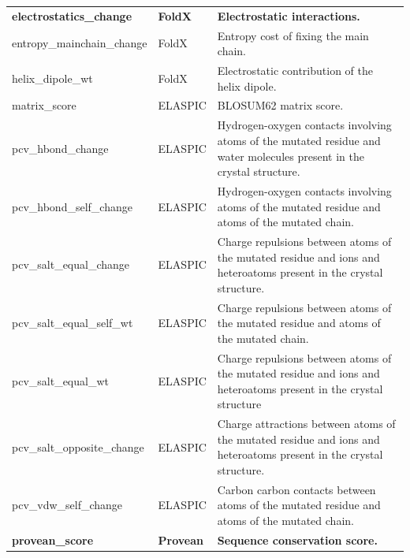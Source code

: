 \begin{table}[tb]
\begin{tabular}{ l | l | p{7cm} }
		\textbf{electrostatics\_change}           & \textbf{FoldX}   & \textbf{Electrostatic interactions.}                                                                                  \\
		entropy\_mainchain\_change                & FoldX            & Entropy cost of fixing the main chain.                                                                                \\
		helix\_dipole\_wt                         & FoldX            & Electrostatic contribution of the helix dipole.                                                                       \\
		matrix\_score                             & ELASPIC          & BLOSUM62 matrix score.                                                                                                \\
		pcv\_hbond\_change                        & ELASPIC          & Hydrogen-oxygen contacts involving atoms of the mutated residue and water molecules present in the crystal structure. \\
		pcv\_hbond\_self\_change                  & ELASPIC          & Hydrogen-oxygen contacts involving atoms of the mutated residue and atoms of the mutated chain.                       \\
		pcv\_salt\_equal\_change                  & ELASPIC          & Charge repulsions between atoms of the mutated residue and ions and heteroatoms present in the crystal structure.     \\
		pcv\_salt\_equal\_self\_wt                & ELASPIC          & Charge repulsions between atoms of the mutated residue and atoms of the mutated chain.                                \\
		pcv\_salt\_equal\_wt                      & ELASPIC          & Charge repulsions between atoms of the mutated residue and ions and heteroatoms present in the crystal structure      \\
		pcv\_salt\_opposite\_change               & ELASPIC          & Charge attractions between atoms of the mutated residue and ions and heteroatoms present in the crystal structure.    \\
		pcv\_vdw\_self\_change                    & ELASPIC          & Carbon carbon contacts between atoms of the mutated residue and atoms of the mutated chain.                           \\
		\textbf{provean\_score}                   & \textbf{Provean} & \textbf{Sequence conservation score.}                                                                                 \\

\end{tabular}
\end{table}
